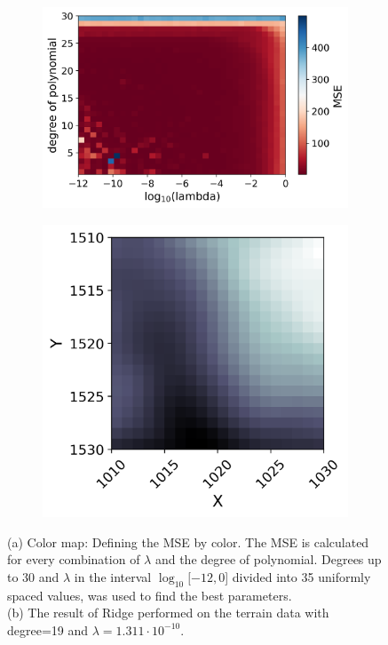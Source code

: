 \documentclass[../main.tex]{subfiles}
\begin{document}
\begin{figure}[H] 
   \centering
   \begin{subfigure}[b]{0.56\textwidth}
    \centering
    \includegraphics[width=\textwidth]{../assets/terrain-ridge-degree-lambda-colormap.png} 
    \caption{}
    \label{fig:ridge_regularization}
   \end{subfigure}
   \quad
   \begin{subfigure}[b]{0.4\textwidth}
    \centering
    \includegraphics[width=\textwidth]{../assets/Terrain_ridge_bestdegree.png} 
    \caption{}
    \label{fig:ridge_estimate}
   \end{subfigure}
   \caption{(a) Color map: Defining the MSE by color. The MSE is calculated for every combination of $\lambda$ and the degree of polynomial. Degrees up to 30 and $\lambda$ in the interval $\log_{10}[ -12,0 $] divided into 35 uniformly spaced values, was used to find the best parameters. \\ (b) The result of Ridge performed on the terrain data with degree=19 and $\lambda=1.311\cdot 10^{-10}$.
   }
   \label{fig:terrain-ridge}
\end{figure} 
\end{document}
